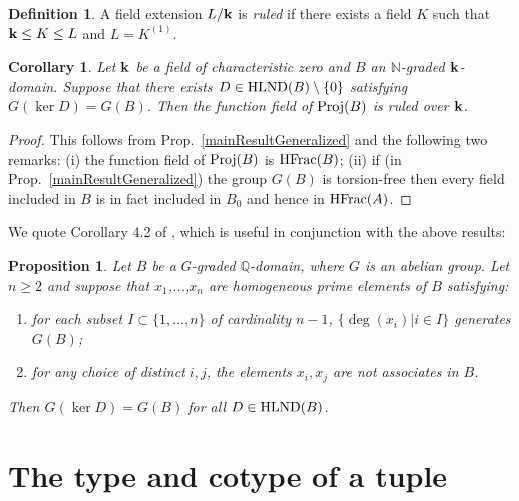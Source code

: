 \documentclass[12pt]{amsart}
\theoremstyle{plain}
\newtheorem{proposition}[subsection]{Proposition}
\newtheorem{corollary}[subsection]{Corollary}
\theoremstyle{definition}
\newtheorem{definition}[subsection]{Definition}
\newcommand{\Proj}{		\operatorname{{\rm Proj}}}
\newcommand{\HFrac}{		\operatorname{{\rm HFrac}}}
\newcommand{\Nat}{\ensuremath{\mathbb{N}}}
\newcommand{\Rat}{\ensuremath{\mathbb{Q}}}
\newcommand{\bk}{{\ensuremath{\rm \bf k}}}
\newcommand{\ggoth}{\mathfrak{g}}
\newcommand{\hlnd}{\operatorname{{\rm HLND}}}
\begin{document}
\begin{definition}
	A field extension $L / \bk$ is \textit{ruled} if there exists a field $K$ such that $\bk \leq K \leq L$ and $L = K^{(1)}$.  
\end{definition}

\begin{corollary} \label{mainResult}
Let $\bk$ be a field of characteristic zero and $B$ an $\Nat$-graded $\bk$-domain.
Suppose that there exists $D \in \hlnd(B) \setminus \{0\}$ satisfying $G( \ker D ) = G(B)$.
Then the function field of $\Proj(B)$ is ruled over $\bk$.
\end{corollary}

\begin{proof}
This follows from Prop.\ \ref{mainResultGeneralized} and the following two remarks:
(i) the function field of $\Proj(B)$ is $\HFrac(B)$;
(ii) if (in Prop.\ \ref{mainResultGeneralized}) the group $G(B)$ is torsion-free then every field included in $B$ is in fact included in $B_0$
and hence in $\HFrac(A)$.
\end{proof}


We quote Corollary 4.2 of \cite{daigle:hal-01691491}, which is useful in conjunction with the above results:

\begin{proposition} Let $B$ be a $G$-graded $\Rat$-domain, where $G$ is an abelian group.
Let $n \geq 2$ and suppose that $x_1$,...,$x_n$ are homogeneous prime elements of $B$ satisfying:
\begin{enumerate}

\item[(i)] for each subset $I \subset \{1,...,n\}$ of cardinality $n - 1$, $\{ \deg(x_i) | i \in I\}$ generates $G(B)$;  

\item[(ii)] for any choice of distinct $i,j$, the elements $x_i, x_j$ are not associates in $B$.

\end{enumerate}
Then $G(\ker D) = G(B)$ for all $D  \in \hlnd(B)$.
\end{proposition}


\section{The type and cotype of a tuple}

%	
\end{document}
